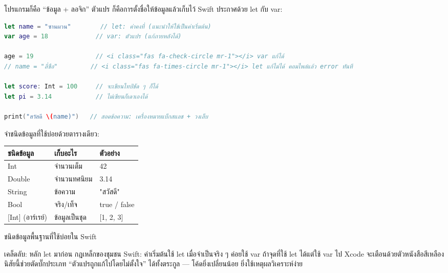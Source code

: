 


โปรแกรมก็คือ “ข้อมูล + ลอจิก” ตัวแปร ก็คือการตั้งชื่อให้ข้อมูลแล้วเก็บไว้ Swift ประกาศด้วย let กับ var:

\begin{lstlisting}[language=Swift]
let name = "ซานผวน"        // let: ค่าคงที่ (แนะนำให้ใช้เป็นค่าเริ่มต้น)
var age = 18             // var: ตัวแปร (แก้ภายหลังได้)

age = 19                 // <i class="fas fa-check-circle mr-1"></i> var แก้ได้
// name = "ลี่ซือ"         // <i class="fas fa-times-circle mr-1"></i> let แก้ไม่ได้ คอมไพล์แล้ว error ทันที

let score: Int = 100     // จะเขียนไทป์ชัด ๆ ก็ได้
let pi = 3.14            // ไม่เขียนก็เดาเองได้

print("สวัสดี \(name)")   // สอดข้อความ: เครื่องหมายแบ็กสแลช + วงเล็บ
\end{lstlisting}

จำชนิดข้อมูลที่ใช้บ่อยด้วยตารางเดียว:

\begin{center}
\begin{tabularx}{\linewidth}{|X|X|X|}
\hline
\textbf{ชนิดข้อมูล} & \textbf{เก็บอะไร} & \textbf{ตัวอย่าง} \tabularnewline
\hline
Int & จำนวนเต็ม & 42 \tabularnewline
Double & จำนวนทศนิยม & 3.14 \tabularnewline
String & ข้อความ & "สวัสดี" \tabularnewline
Bool & จริง/เท็จ & true / false \tabularnewline
{}[Int] (อาร์เรย์) & ข้อมูลเป็นชุด & {}[1, 2, 3] \tabularnewline
\hline
\end{tabularx}
\end{center}

\begin{center}\small\color{gray}ชนิดข้อมูลพื้นฐานที่ใช้บ่อยใน Swift\end{center}

\begin{tcbinfo}{เคล็ดลับ: หลัก let มาก่อน}
กฎเหล็กของชุมชน Swift: ค่าเริ่มต้นใช้ let เมื่อจำเป็นจริง ๆ ค่อยใช้ var ถ้าจุดที่ใช้ let ได้แต่ใช้ var ไป Xcode จะเตือนด้วยตัวหนังสือสีเหลือง นิสัยนี้ช่วยตัดบั๊กประเภท “ตัวแปรถูกแก้ไปโดยไม่ตั้งใจ” ได้ทั้งตระกูล — โค้ดยิ่งเปลี่ยนน้อย ยิ่งใช้เหตุผลวิเคราะห์ง่าย

\end{tcbinfo}

